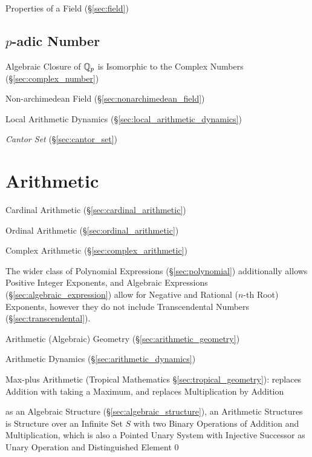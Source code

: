 Properties of a Field (\S\ref{sec:field})



\subsection{$p$-adic Number}\label{sec:padic_number}

Algebraic Closure of $\mathbb{Q}_p$ is Isomorphic to the Complex Numbers
(\S\ref{sec:complex_number})

Non-archimedean Field (\S\ref{sec:nonarchimedean_field})

Local Arithmetic Dynamics (\S\ref{sec:local_arithmetic_dynamics})

\emph{Cantor Set} (\S\ref{sec:cantor_set})



\section{Arithmetic}\label{sec:arithmetic}

Cardinal Arithmetic (\S\ref{sec:cardinal_arithmetic})

Ordinal Arithmetic (\S\ref{sec:ordinal_arithmetic})

Complex Arithmetic (\S\ref{sec:complex_arithmetic})

The wider class of Polynomial Expressions (\S\ref{sec:polynomial}) additionally
allows Positive Integer Exponents, and Algebraic Expressions
(\S\ref{sec:algebraic_expression}) allow for Negative and Rational ($n$-th
Root) Exponents, however they do not include Transcendental Numbers
(\S\ref{sec:transcendental}).

\fist Arithmetic (Algebraic) Geometry (\S\ref{sec:arithmetic_geometry})

\fist Arithmetic Dynamics (\S\ref{sec:arithmetic_dynamics})

\fist Max-plus Arithmetic (Tropical Mathematics \S\ref{sec:tropical_geometry}):
replaces Addition with taking a Maximum, and replaces Multiplication by Addition

as an Algebraic Structure (\S\ref{sec:algebraic_structure}), an Arithmetic
Structures is Structure over an Infinite Set $S$ with two Binary Operations of
Addition and Multiplication, which is also a Pointed Unary System with
Injective Successor as Unary Operation and Distinguished Element $0$

